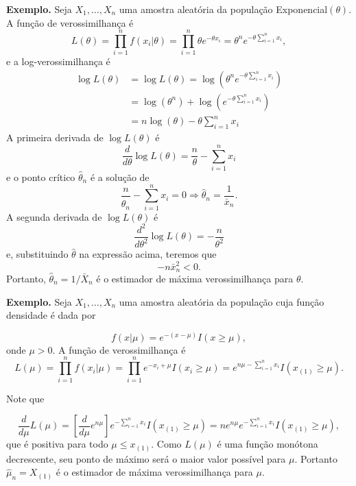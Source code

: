 \documentclass[
  letterpaper,
  DIV=11,
  numbers=noendperiod]{scrartcl}
\begin{document}
\textbf{Exemplo.} Seja \(X_1,\ldots,X_n\) uma amostra aleatória da
população Exponencial\((\theta)\). A função de verossimilhança é
\[L(\theta)=\prod_{i=1}^{n}f(x_i|\theta)=\prod_{i=1}^{n}\theta e^{-\theta x_i}=\theta^n e^{-\theta\sum_{i=1}^n x_i},\]
e a log-verossimilhança é \[\begin{align*}
\log L(\theta)&=\log L(\theta)=\log\left(\theta^n e^{-\theta\sum_{i=1}^n x_i}\right)\\
&= \log(\theta^n) + \log\left(e^{-\theta\sum_{i=1}^n x_i}\right)\\
&= n\log(\theta) -\theta\sum_{i=1}^{n}x_i \end{align*}\] A primeira
derivada de \(\log L(\theta)\) é
\[\frac{d}{d\theta}\log L(\theta)=\frac{n}{\theta}-\sum_{i=1}^{n}x_i\] e
o ponto crítico \(\hat{\theta}_n\) é a solução de
\[\frac{n}{\hat{\theta}_n}-\sum_{i=1}^n x_i=0\Rightarrow \hat{\theta}_n=\frac{1}{\bar{x}_n}.\]
A segunda derivada de \(\log L(\theta)\) é
\[\frac{d^2}{d\theta^2}\log L(\theta)=-\frac{n}{\theta^2}\] e,
substituindo \(\hat{\theta}\) na expressão acima, teremos que
\[-n\bar{x}_n^2<0.\] Portanto, \(\hat{\theta}_n=1/\bar{X}_n\) é o
estimador de máxima verossimilhança para \(\theta\).

\textbf{Exemplo.} Seja \(X_1,\ldots,X_n\) uma amostra aleatória da
população cuja função densidade é dada por

\[f(x|\mu)=e^{-(x-\mu)}I(x\geq \mu),\] onde \(\mu>0\). A função de
verossimilhança é
\[L(\mu)=\prod_{i=1}^{n}f(x_i|\mu)=\prod_{i=1}^{n}e^{-x_i+\mu}I(x_i\geq\mu)=e^{n\mu-\sum_{i=1}^n x_i}I(x_{(1)}\geq \mu).\]

Note que

\[\frac{d}{d\mu}L(\mu)=\left[\frac{d}{d\mu}e^{n\mu}\right]e^{-\sum_{i=1}^n x_i}I(x_{(1)}\geq \mu)=ne^{n\mu}e^{-\sum_{i=1}^n x_i}I(x_{(1)}\geq \mu),\]
que é positiva para todo \(\mu \leq x_{(1)}\). Como \(L(\mu)\) é uma
função monótona decrescente, seu ponto de máximo será o maior valor
possível para \(\mu\). Portanto \(\hat{\mu}_n=X_{(1)}\) é o estimador de
máxima verossimilhança para \(\mu\).
\end{document}
